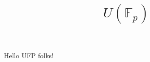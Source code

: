 \documentclass{amsart}
\title{$U(\mathbb{F}_p)$}
\begin{document}
    \maketitle

 Hello UFP folks!
\end{document}
